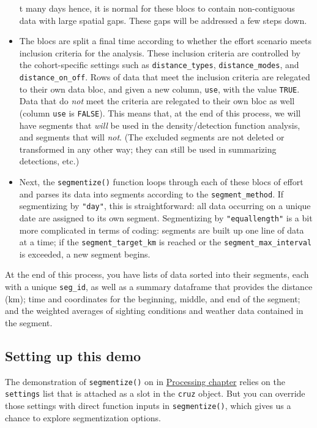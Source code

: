 \documentclass[
]{book}
\begin{document}
\begin{itemize}
t many days hence, it is normal for these blocs to contain non-contiguous data with large spatial gaps. These gaps will be addressed a few steps down.
\item
  The blocs are split a final time according to whether the effort scenario meets inclusion criteria for the analysis. These inclusion criteria are controlled by the cohort-specific settings such as \texttt{distance\_types}, \texttt{distance\_modes}, and \texttt{distance\_on\_off}. Rows of data that meet the inclusion criteria are relegated to their own data bloc, and given a new column, \texttt{use}, with the value \texttt{TRUE}. Data that do \emph{not} meet the criteria are relegated to their own bloc as well (column \texttt{use} is \texttt{FALSE}). This means that, at the end of this process, we will have segments that \emph{will} be used in the density/detection function analysis, and segments that will \emph{not}. (The excluded segments are not deleted or transformed in any other way; they can still be used in summarizing detections, etc.)
\item
  Next, the \texttt{segmentize()} function loops through each of these blocs of effort and parses its data into segments according to the \texttt{segment\_method}. If segmentizing by \texttt{"day"}, this is straightforward: all data occurring on a unique date are assigned to its own segment. Segmentizing by \texttt{"equallength"} is a bit more complicated in terms of coding: segments are built up one line of data at a time; if the \texttt{segment\_target\_km} is reached or the \texttt{segment\_max\_interval} is exceeded, a new segment begins.
\end{itemize}

At the end of this process, you have lists of data sorted into their segments, each with a unique \texttt{seg\_id}, as well as a summary dataframe that provides the distance (km); time and coordinates for the beginning, middle, and end of the segment; and the weighted averages of sighting conditions and weather data contained in the segment.

\hypertarget{setting-up-this-demo}{%
\subsection*{Setting up this demo}\label{setting-up-this-demo}}

The demonstration of \texttt{segmentize()} on in \protect\hyperlink{processing}{Processing chapter} relies on the \texttt{settings} list that is attached as a slot in the \texttt{cruz} object. But you can override those settings with direct function inputs in \texttt{segmentize()}, which gives us a chance to explore segmentization options.
\end{document}
